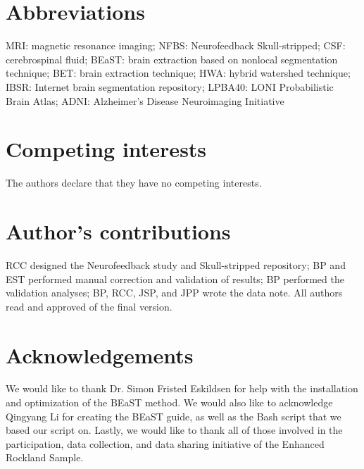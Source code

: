 \documentclass{bmcart}
\begin{document}

\begin{backmatter}

\section*{Abbreviations}
  MRI: magnetic resonance imaging; NFBS: Neurofeedback Skull-stripped; CSF: cerebrospinal fluid; BEaST: brain extraction based on nonlocal segmentation technique; BET: brain extraction technique; HWA: hybrid watershed technique; IBSR: Internet brain segmentation repository; LPBA40: LONI Probabilistic Brain Atlas; ADNI: Alzheimer's Disease Neuroimaging Initiative

\section*{Competing interests}
  The authors declare that they have no competing interests.

\section*{Author's contributions}
    RCC designed the Neurofeedback study and Skull-stripped repository;  BP and EST performed manual correction and validation of results; BP performed the validation analyses; BP, RCC, JSP, and JPP wrote the data note. All authors read and approved of the final version.

\section*{Acknowledgements}
  We would like to thank Dr. Simon Fristed Eskildsen for help with the installation and optimization of the BEaST method. We would also like to acknowledge Qingyang Li for creating the BEaST guide, as well as the Bash script that we based our script on. Lastly, we would like to thank all of those involved in the participation, data collection, and data sharing initiative of the Enhanced Rockland Sample.
  


\end{backmatter}
\end{document}
